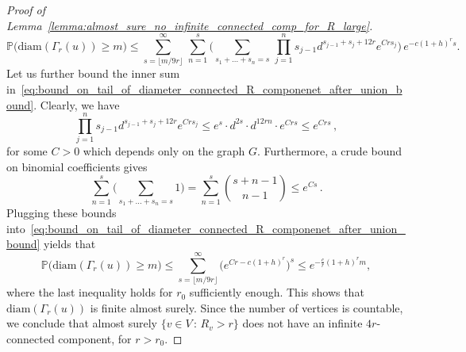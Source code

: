 \documentclass[11pt, reqno]{article}
\numberwithin{equation}{section}
\theoremstyle{definition}
\def\P{\mathbb{P}}
\newcommand{\1}{\mathds{1}}
\begin{document}
\begin{proof}[Proof of Lemma~\ref{lemma:almost_sure_no_infinite_connected_comp_for_R_large}]
    \begin{equation}
        \label{eq:bound_on_tail_of_diameter_connected_R_componenet_after_union_bound}
        \P\big(\text{diam}(\Gamma_r(u))\ge m\big) \le \sum_{s = \lfloor m/9r \rfloor}^{\infty} \,  \sum_{n=1}^{s} \bigg(\sum_{s_1+\ldots+s_n = s} \,  \prod_{j=1}^n s_{j-1} d^{s_{j-1} + s_{j} + 12r} e^{Crs_j} \bigg) \, e^{-c(1+h)^{r} s}.
    \end{equation}
    Let us further bound the inner sum in~\eqref{eq:bound_on_tail_of_diameter_connected_R_componenet_after_union_bound}. Clearly, we have
    \[
    \prod_{j=1}^n s_{j-1} d^{s_{j-1} + s_{j} + 12r} e^{Crs_j} \le e^s \cdot d^{2s} \cdot d^{12rn} \cdot e^{Crs} \le e^{Crs} \, ,
    \]
    for some $C>0$ which depends only on the graph $G$.
    Furthermore, a crude bound on binomial coefficients gives
    \[
    \sum_{n=1}^{s}\Big(\sum_{s_1+\ldots+s_n = s} 1\Big)= \sum_{n=1}^{s} \binom{s+n-1}{n-1} \le e^{Cs} \, .
    \]
    Plugging these bounds into~\eqref{eq:bound_on_tail_of_diameter_connected_R_componenet_after_union_bound} yields that
    \[
    \P\big(\text{diam}(\Gamma_r(u))\ge m\big) \le \sum_{s = \lfloor m/9r \rfloor}^{\infty} \big(e^{Cr- c(1+h)^r}\big)^s  \le e^{-\frac cr (1+h)^r m},
    \]
    where the last inequality holds for $r_0$ sufficiently enough. This shows that $\text{diam}(\Gamma_r(u))$ is finite almost surely. Since the number of vertices is countable, we conclude that almost surely $\{v\in V \, : \, R_v>r \}$ does not have an infinite $4r$-connected component, for $r>r_0$.     
    

\end{proof}
\end{document}
